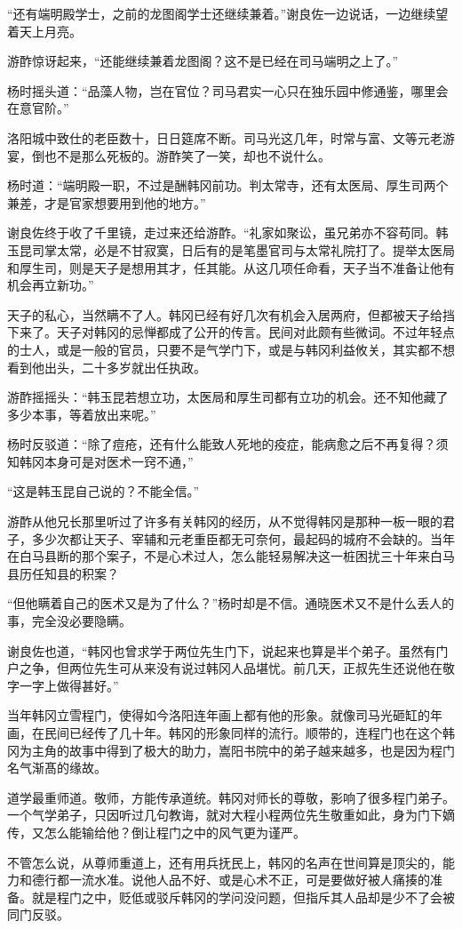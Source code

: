 “还有端明殿学士，之前的龙图阁学士还继续兼着。”谢良佐一边说话，一边继续望着天上月亮。

游酢惊讶起来，“还能继续兼着龙图阁？这不是已经在司马端明之上了。”

杨时摇头道：“品藻人物，岂在官位？司马君实一心只在独乐园中修通鉴，哪里会在意官阶。”

洛阳城中致仕的老臣数十，日日筵席不断。司马光这几年，时常与富、文等元老游宴，倒也不是那么死板的。游酢笑了一笑，却也不说什么。

杨时道：“端明殿一职，不过是酬韩冈前功。判太常寺，还有太医局、厚生司两个兼差，才是官家想要用到他的地方。”

谢良佐终于收了千里镜，走过来还给游酢。“礼家如聚讼，虽兄弟亦不容苟同。韩玉昆司掌太常，必是不甘寂寞，日后有的是笔墨官司与太常礼院打了。提举太医局和厚生司，则是天子是想用其才，任其能。从这几项任命看，天子当不准备让他有机会再立新功。”

天子的私心，当然瞒不了人。韩冈已经有好几次有机会入居两府，但都被天子给挡下来了。天子对韩冈的忌惮都成了公开的传言。民间对此颇有些微词。不过年轻点的士人，或是一般的官员，只要不是气学门下，或是与韩冈利益攸关，其实都不想看到他出头，二十多岁就出任执政。

游酢摇摇头：“韩玉昆若想立功，太医局和厚生司都有立功的机会。还不知他藏了多少本事，等着放出来呢。”

杨时反驳道：“除了痘疮，还有什么能致人死地的疫症，能病愈之后不再复得？须知韩冈本身可是对医术一窍不通，”

“这是韩玉昆自己说的？不能全信。”

游酢从他兄长那里听过了许多有关韩冈的经历，从不觉得韩冈是那种一板一眼的君子，多少次都让天子、宰辅和元老重臣都无可奈何，最起码的城府不会缺的。当年在白马县断的那个案子，不是心术过人，怎么能轻易解决这一桩困扰三十年来白马县历任知县的积案？

“但他瞒着自己的医术又是为了什么？”杨时却是不信。通晓医术又不是什么丢人的事，完全没必要隐瞒。

谢良佐也道，“韩冈也曾求学于两位先生门下，说起来也算是半个弟子。虽然有门户之争，但两位先生可从来没有说过韩冈人品堪忧。前几天，正叔先生还说他在敬字一字上做得甚好。”

当年韩冈立雪程门，使得如今洛阳连年画上都有他的形象。就像司马光砸缸的年画，在民间已经传了几十年。韩冈的形象同样的流行。顺带的，连程门也在这个韩冈为主角的故事中得到了极大的助力，嵩阳书院中的弟子越来越多，也是因为程门名气渐髙的缘故。

道学最重师道。敬师，方能传承道统。韩冈对师长的尊敬，影响了很多程门弟子。一个气学弟子，只因听过几句教诲，就对大程小程两位先生敬重如此，身为门下嫡传，又怎么能输给他？倒让程门之中的风气更为谨严。

不管怎么说，从尊师重道上，还有用兵抚民上，韩冈的名声在世间算是顶尖的，能力和德行都一流水准。说他人品不好、或是心术不正，可是要做好被人痛揍的准备。就是程门之中，贬低或驳斥韩冈的学问没问题，但指斥其人品却是少不了会被同门反驳。

